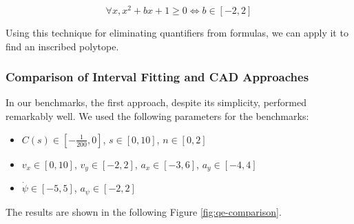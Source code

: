 \[ \forall x, x^2 + bx + 1 \geq 0 \iff b \in [-2, 2] \]

Using this technique for
eliminating quantifiers from formulas, we can apply it to find an inscribed polytope.

\subsubsection{Comparison of Interval Fitting and CAD Approaches}

In our benchmarks, the first approach, despite its simplicity, performed remarkably well.
We used the following parameters for the benchmarks:
\begin{itemize}
	\item $C(s) \in \left[-\frac{1}{200}, 0\right]$, $s \in [0, 10]$, $n \in [0, 2]$
	\item $v_x \in [0, 10]$, $v_y \in [-2, 2]$, $a_x \in [-3, 6]$, $a_y \in [-4, 4]$
	\item $\dot{\psi} \in [-5, 5]$, $a_\psi \in [-2, 2]$
\end{itemize}

The results are shown in the following Figure \ref{fig:qe-comparison}.

